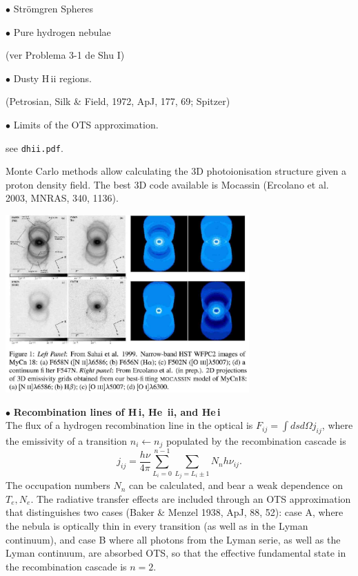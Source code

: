 
{$\bullet$ Str\"omgren Spheres}

{$\bullet$ Pure hydrogen nebulae}

(ver Problema 3-1 de Shu I)

{$\bullet$ Dusty H\,{\sc ii} regions.}

(Petrosian, Silk \& Field, 1972, ApJ, 177, 69; Spitzer)

{$\bullet$ Limits of the OTS approximation}.

see {\tt dhii.pdf}. 


Monte Carlo methods allow calculating the 3D photoionisation structure
given a proton density field. The best 3D code available is Mocassin
(Ercolano et al. 2003, MNRAS, 340, 1136). 
\begin{center}
  \includegraphics[width=0.7\textwidth,height=!]{./C/MyCn18_mocassin.jpg}
\end{center}



{$\bullet$ \bf Recombination lines of  H\,{\sc i}, He\,{\sc
ii}, and He\,{\sc i} } \\

The flux of a hydrogen recombination line in the optical is $F_{ij} =
\int ds d\Omega j_{ij}$, where the emissivity of a transition  $n_i
\leftarrow n_j$ populated by the recombination cascade is 
\[ 
j_{ij} = \frac{h \nu}{4 \pi} \sum_{L_i=0}^{n-1} \sum_{L_j=L_i\pm1} N_n
h\nu_{ij}.
\]
The occupation numbers $N_n$ can be calculated, and bear a weak
dependence on ${T_e,N_e}$. The radiative transfer effects are included
through an OTS approximation that distinguishes two cases (Baker \&
Menzel 1938, ApJ, 88, 52): case A, where the nebula is optically thin
in every transition (as well as in the Lyman continuum), and case B
where all photons from the Lyman serie, as well as the Lyman
continuum, are absorbed OTS, so that the effective fundamental state
in the recombination cascade is $n=2$.


